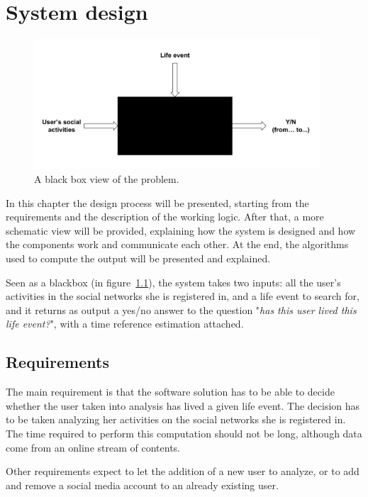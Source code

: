 \chapter{System design}
\label{cha:design}

\begin{figure}[H]
\centering
\includegraphics[width=%
0.95\textwidth]{img/bb}
\caption{A black box view of the problem.}
\label{fig:bb}
\end{figure}

In this chapter the design process will be presented, starting from the requirements and the description of the working logic. After that, a more schematic view will be provided, explaining how the system is designed and how the components work and communicate each other. At the end, the algorithms used to compute the output will be presented and explained.

Seen as a blackbox (in figure~\ref{fig:bb}), the system takes two inputs: all the user's activities in the social networks she is registered in, and a life event to search for, and it returns as output a yes/no answer to the question "\textit{has this user lived this life event?}", with a time reference estimation attached.

\section{Requirements}

The main requirement is that the software solution has to be able to decide whether the user taken into analysis has lived a given life event. The decision has to be taken analyzing her activities on the social networks she is registered in. The time required to perform this computation should not be long, although data come from an online stream of contents.

Other requirements expect to let the addition of a new user to analyze, or to add and remove a social media account to an already existing user.

